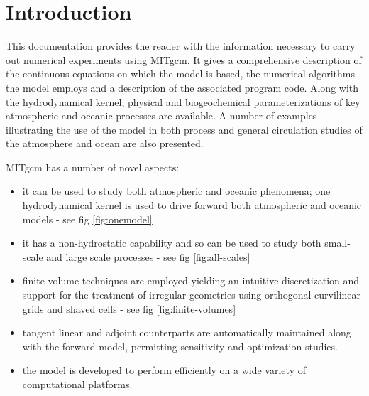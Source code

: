 \documentclass[12pt]{book}
\begin{document}
\tableofcontents




\section{Introduction}

This documentation provides the reader with the information necessary to
carry out numerical experiments using MITgcm. It gives a comprehensive
description of the continuous equations on which the model is based, the
numerical algorithms the model employs and a description of the associated
program code. Along with the hydrodynamical kernel, physical and
biogeochemical parameterizations of key atmospheric and oceanic processes
are available. A number of examples illustrating the use of the model in
both process and general circulation studies of the atmosphere and ocean are
also presented.

MITgcm has a number of novel aspects:

\begin{itemize}
\item it can be used to study both atmospheric and oceanic phenomena; one
hydrodynamical kernel is used to drive forward both atmospheric and oceanic
models - see fig
\ref{fig:onemodel}


\item it has a non-hydrostatic capability and so can be used to study both
small-scale and large scale processes - see fig 
\ref{fig:all-scales}


\item finite volume techniques are employed yielding an intuitive
discretization and support for the treatment of irregular geometries using
orthogonal curvilinear grids and shaved cells - see fig 
\ref{fig:finite-volumes}


\item tangent linear and adjoint counterparts are automatically maintained
along with the forward model, permitting sensitivity and optimization
studies.

\item the model is developed to perform efficiently on a wide variety of
computational platforms.
\end{itemize}
\end{document}
